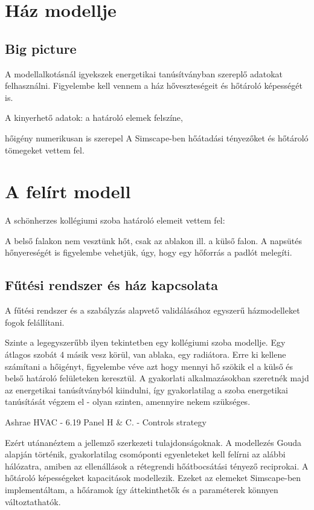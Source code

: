 \section{Ház modellje}

\subsection{Big picture}

A modellalkotásnál igyekszek energetikai tanúsítványban szereplő adatokat felhasználni.
Figyelembe kell vennem a ház hőveszteségeit és hőtároló képességét is.

A kinyerhető adatok: a határoló elemek felszíne,

hőigény numerikusan is szerepel
A Simscape-ben hőátadási tényezőket és hőtároló tömegeket vettem fel.


\section{A felírt modell}

A schönherzes kollégiumi szoba határoló elemeit vettem fel:


A belső falakon nem vesztünk hőt, csak az ablakon ill. a külső falon.
A napsütés hőnyereségét is figyelembe vehetjük, úgy, hogy egy hőforrás a padlót melegíti.



\subsection{Fűtési rendszer és ház kapcsolata}





A fűtési rendszer és a szabályzás alapvető validálásához egyszerű házmodelleket fogok felállítani.

Szinte a legegyszerűbb ilyen tekintetben egy kollégiumi szoba modellje. Egy átlagos szobát 4 másik vesz körül, van ablaka, egy radiátora.
Erre ki kellene számítani a hőigényt, figyelembe véve azt hogy mennyi hő szökik el a külső és belső határoló felületeken keresztül.
A gyakorlati alkalmazásokban szeretnék majd az energetikai tanúsítványból kiindulni, így gyakorlatilag a szoba energetikai tanúsítását végzem el - olyan szinten, amennyire nekem szükséges.


Ashrae HVAC - 6.19 Panel H \& C. - Controls strategy

Ezért utánanéztem a jellemző szerkezeti tulajdonságoknak. A modellezés Gouda alapján történik, gyakorlatilag csomóponti egyenleteket kell felírni az alábbi hálózatra, amiben az ellenállások a rétegrendi hőátbocsátási tényező reciprokai. A hőtároló képességeket kapacitások modellezik. Ezeket az elemeket Simscape-ben implementáltam, a hőáramok így áttekinthetők és a paraméterek könnyen változtathatók.

